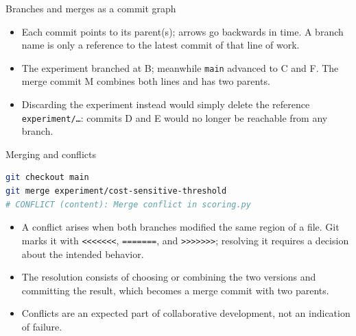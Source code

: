 \begin{frame}{Branches and merges as a commit graph}
\centering
{}
\vspace{0.6em}
\begin{itemize}\footnotesize
\item Each commit points to its parent(s); arrows go backwards in time. A branch name is only a reference to the latest commit of that line of work.
\item The experiment branched at B; meanwhile \texttt{main} advanced to C and F. The merge commit M combines both lines and has two parents.
\item Discarding the experiment instead would simply delete the reference \texttt{experiment/\dots}: commits D and E would no longer be reachable from any branch.
\end{itemize}
\coursefooter
\end{frame}

\begin{frame}[fragile]{Merging and conflicts}
\begin{lstlisting}[style=coursepython,language=bash]
git checkout main
git merge experiment/cost-sensitive-threshold
# CONFLICT (content): Merge conflict in scoring.py
\end{lstlisting}
\begin{itemize}
\item A conflict arises when both branches modified the same region of a file. Git marks it with \texttt{<{}<{}<{}<{}<{}<{}<}, \texttt{=======}, and \texttt{>{}>{}>{}>{}>{}>{}>}; resolving it requires a decision about the intended behavior.
\item The resolution consists of choosing or combining the two versions and committing the result, which becomes a merge commit with two parents.
\item Conflicts are an expected part of collaborative development, not an indication of failure.
\end{itemize}
\coursefooter
\end{frame}

